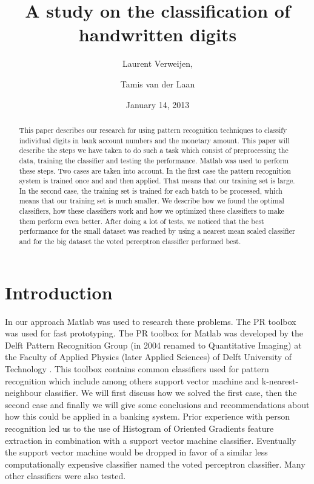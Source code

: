 \documentclass[%
        compressed,
        final,
        notitlepage,
        narroweqnarray,
        inline,
        twoside,
        ]{ieee}
\title{A study on the classification of handwritten digits}
\author{Laurent Verweijen, \and Tamis van der Laan}
\date{January 14, 2013}
\begin{document}
\maketitle

\begin{abstract}
This paper describes our research for using pattern recognition techniques to classify individual digits in bank account numbers and the monetary amount. This paper will describe the steps we have taken to do such a task which consist of preprocessing the data, training the classifier and testing the performance. Matlab was used to perform these steps. Two cases are taken into account. In the first case the pattern recognition system is trained once and and then applied. That means that our training set is large. In the second case, the training set is trained for each batch to be processed, which means that our training set is much smaller. We describe how we found the optimal classifiers, how these classifiers work and how we optimized these classifiers to make them perform even better. After doing a lot of tests, we noticed that the best performance for the small dataset was reached by using a nearest mean scaled classifier and for the big dataset the voted perceptron classifier performed best. 
\end{abstract}

\section{Introduction}

In our approach Matlab was used to research these problems. The PR toolbox was
used for fast prototyping. The PR toolbox for Matlab was developed by the Delft
Pattern Recognition Group (in 2004 renamed to Quantitative Imaging) at the
Faculty of Applied Physics (later Applied Sciences) of Delft University of
Technology \cite{Ferdi}.
This toolbox contains common classifiers used for pattern recognition which
include among others support vector machine and k-nearest-neighbour classifier. We will first
discuss how we solved the first case, then the second case and finally we will
give some conclusions and recommendations about how this could be applied in a
banking system. Prior experience with person recognition \cite{Tamis} led us to
the use of Histogram of Oriented Gradients feature
extraction in combination with a support vector machine classifier. Eventually
the support vector machine would be dropped in favor of a similar less
computationally expensive classifier named the voted perceptron classifier. Many
other classifiers were also tested.
\end{document}
